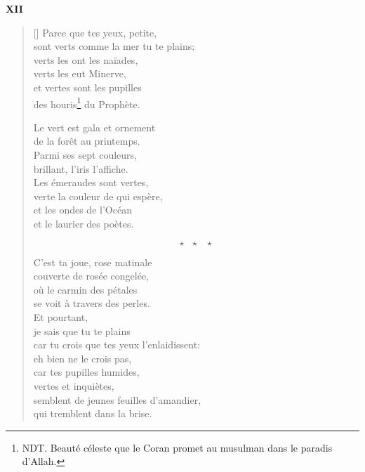 \documentclass[a4paper,12pt]{book}
\begin{document}
\bigskip

\begin{center}
  \textbf{XII}
\end{center}

\settowidth{\versewidth}{Parce que sont, petite, tes yeux}

\begin{verse}[\versewidth]
  Parce que tes yeux, petite, \\
  sont verts comme la mer tu te plains; \\
  verts les ont les naïades, \\
  verts les eut Minerve, \\
  et vertes sont les pupilles \\
  des houris\footnote{NDT. Beauté céleste que le Coran promet au musulman dans le paradis d'Allah.} du Prophète.

  Le vert est gala et ornement \\
  de la forêt au printemps. \\
  Parmi ses sept couleurs, \\
  brillant, l'iris l'affiche. \\
  Les émeraudes sont vertes, \\
  verte la couleur de qui espère, \\
  et les ondes de l'Océan \\
  et le laurier des poètes.

  $$\star \ \ \ \star \ \ \ \star$$

  C'est ta joue, rose matinale \\
  couverte de rosée congelée, \\
  où le carmin des pétales \\
  se voit à travers des perles. \\
  Et pourtant, \\
  je sais que tu te plains \\
  car tu crois que tes yeux
  l'enlaidissent: \\
  eh bien ne le crois pas, \\
  car tes pupilles humides, \\
  vertes et inquiètes, \\
  semblent de jeunes feuilles d'amandier, \\
  qui tremblent dans la brise.


\end{verse}
\end{document}
